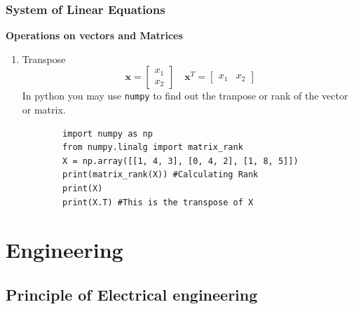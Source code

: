 \documentclass{article}
\newcommand{\matr}[1]{\mathbf{#1}}
\begin{document}
\subsubsection{System of Linear Equations}
\textbf{Operations on vectors and Matrices}
\begin{enumerate}
    \item Transpose \\
    \[\matr{x} = \begin{bmatrix}
        x_1 \\
        x_2
    \end{bmatrix} \quad \matr{x}^T = \begin{bmatrix}
        x_1& x_2
    \end{bmatrix}\]
    In python you may use \texttt{numpy} to find out the tranpose or rank of the vector or matrix.
    \begin{verbatim}
        import numpy as np
        from numpy.linalg import matrix_rank
        X = np.array([[1, 4, 3], [0, 4, 2], [1, 8, 5]]) 
        print(matrix_rank(X)) #Calculating Rank
        print(X)
        print(X.T) #This is the transpose of X
    \end{verbatim}
    
\end{enumerate}




\newpage
\section{Engineering}
\subsection{Principle of Electrical engineering}
\end{document}
